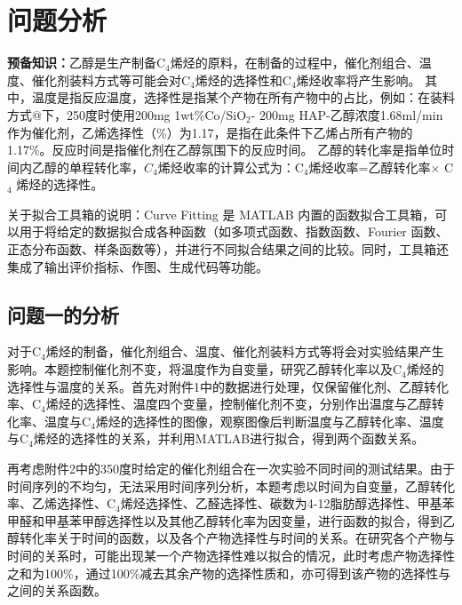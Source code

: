 \documentclass[a4paper,10.5pt]{ctexart}
\makeatletter
\newcommand{\Rmnum}[1]{\expandafter\@slowromancap\romannumeral #1@}
\makeatother
\begin{document}
\section{问题分析}
\textbf{预备知识：}乙醇是生产制备C$_4$烯烃的原料，在制备的过程中，催化剂组合、温度、催化剂装料方式等可能会对C$_4$烯烃的选择性和C$_4$烯烃收率将产生影响。
其中，温度是指反应温度，选择性是指某个产物在所有产物中的占比，例如：在装料方式\Rmnum{1}下，250度时使用200mg 1wt\%Co/SiO$_2$- 200mg HAP-乙醇浓度1.68ml/min作为催化剂，乙烯选择性（\%）为1.17，是指在此条件下乙烯占所有产物的1.17\%。反应时间是指催化剂在乙醇氛围下的反应时间。
乙醇的转化率是指单位时间内乙醇的单程转化率，$C_4$烯烃收率的计算公式为：C$_4$烯烃收率=乙醇转化率$\times$ C$_4$ 烯烃的选择性。
\par 关于拟合工具箱的说明：Curve Fitting 是 MATLAB 内置的函数拟合工具箱，可以用于将给定的数据拟合成各种函数（如多项式函数、指数函数、Fourier 函数、正态分布函数、样条函数等），并进行不同拟合结果之间的比较。同时，工具箱还集成了输出评价指标、作图、生成代码等功能。

\subsection{问题一的分析}
对于C$_4$烯烃的制备，催化剂组合、温度、催化剂装料方式等将会对实验结果产生影响。本题控制催化剂不变，将温度作为自变量，研究乙醇转化率以及C$_4$烯烃的选择性与温度的关系。首先对附件1中的数据进行处理，仅保留催化剂、乙醇转化率、C$_4$烯烃的选择性、温度四个变量，控制催化剂不变，分别作出温度与乙醇转化率、温度与C$_4$烯烃的选择性的图像，观察图像后判断温度与乙醇转化率、温度与C$_4$烯烃的选择性的关系，并利用MATLAB进行拟合，得到两个函数关系。

再考虑附件2中的350度时给定的催化剂组合在一次实验不同时间的测试结果。由于时间序列的不均匀，无法采用时间序列分析，本题考虑以时间为自变量，乙醇转化率、乙烯选择性、C$_4$烯烃选择性、乙醛选择性、碳数为4-12脂肪醇选择性、甲基苯甲醛和甲基苯甲醇选择性以及其他乙醇转化率为因变量，进行函数的拟合，得到乙醇转化率关于时间的函数，以及各个产物选择性与时间的关系。在研究各个产物与时间的关系时，可能出现某一个产物选择性难以拟合的情况，此时考虑产物选择性之和为100\%，通过100\%减去其余产物的选择性质和，亦可得到该产物的选择性与之间的关系函数。
\end{document}
